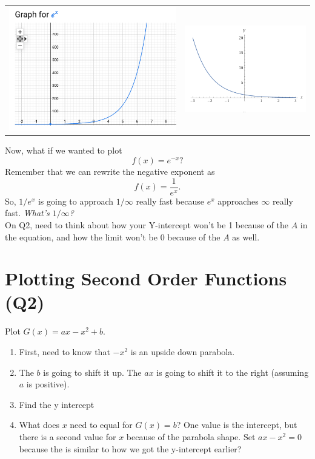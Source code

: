 \documentclass{article}
\begin{document}
\begin{tabular}{c|c}
      \includegraphics[width=0.45\linewidth]{Screen Shot 2024-09-09 at 4.44.20 PM.png} &  \includegraphics[width=0.45\linewidth]{Screen Shot 2024-09-09 at 5.00.44 PM.png}
\end{tabular}


Now, what if we wanted to plot \[f(x) = e^{-x}?\] Remember that we can rewrite the negative exponent as \[f(x) = \frac{1}{e^x}.\] 
So, $1/e^x$ is going to approach $1/\infty$ really fast because $e^x$ approaches $\infty$ really fast. \textit{What's $1/\infty$?}\\

On Q2, need to think about how your Y-intercept won't be 1 because of the $A$ in the equation, and how the limit won't be 0 because of the $A$ as well. 

\section{Plotting Second Order Functions (Q2)}
Plot $G(x) = ax - x^2 +b$. 

\begin{enumerate}
    \item First, need to know that $-x^2$ is an upside down parabola.
    \item The $b$ is going to shift it up. The $ax$ is going to shift it to the right (assuming $a$ is positive). 
    \item Find the y intercept  
    \item What does $x$ need to equal for $G(x) = b$? One value is the intercept, but there is a second value for $x$ because of the parabola shape. Set $ax-x^2=0$ because the is similar to how we got the y-intercept earlier? 
\end{enumerate}
\end{document}
